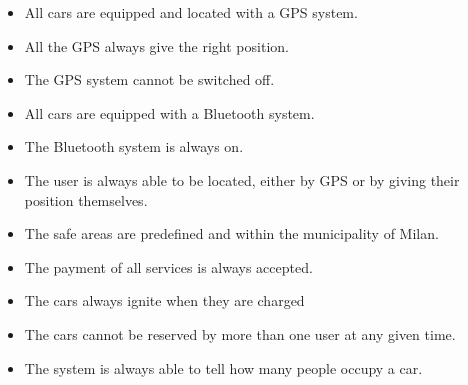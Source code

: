 \documentclass{article}
\begin{document}
			\begin{itemize}
				\item All cars are equipped and located with a GPS system.
				\item All the GPS always give the right position.
				\item The GPS system cannot be switched off.
				\item All cars are equipped with a Bluetooth system.
				\item The Bluetooth system is always on.
				\item The user is always able to be located, either by GPS or by giving their position themselves.
				\item The safe areas are predefined and within the municipality of Milan.
				\item The payment of all services is always accepted. %
				\item The cars always ignite when they are charged %
				\item The cars cannot be reserved by more than one user at any given time. %
				\item The system is always able to tell how many people occupy a car.

			\end{itemize}
\end{document}

